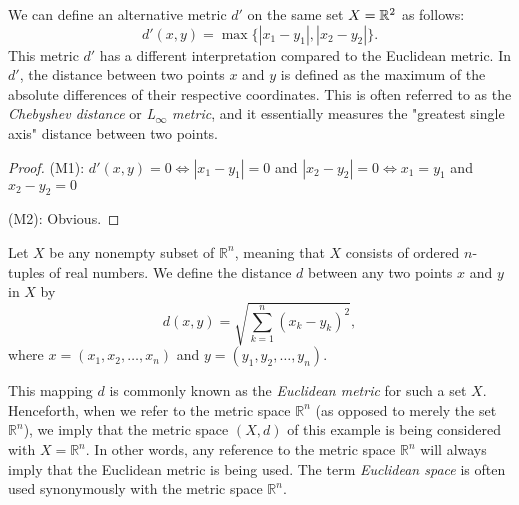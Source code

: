 \begin{example}
    We can define an alternative metric \( d' \) on the same set \( X = \mathbb R^2 \) as follows:
    \[
    d'(x, y) = \max\{|x_1 - y_1|, |x_2 - y_2|\}.
    \]
    This metric \( d' \) has a different interpretation compared to the Euclidean metric. In \( d' \), the distance between two points \( x \) and \( y \) is defined as the maximum of the absolute differences of their respective coordinates. This is often referred to as the \textit{Chebyshev distance} or \textit{L\textsubscript{$\infty$} metric}, and it essentially measures the "greatest single axis" distance between two points.

\end{example}
\begin{proof}
    \item (M1): $d'(x,y) = 0 \iff |x_{1} - y_{1}| =0$ and $|x_{2} - y_{2}| =0 \iff x_1 = y_1$ and $x_2 - y_2 = 0$ 
    \item (M2): Obvious.
    \item 
\end{proof}
\begin{example}
    Let \(X\) be any nonempty subset of \(\mathbb{R}^n\), meaning that \(X\) consists of ordered \(n\)-tuples of real numbers. We define the distance \(d\) between any two points \(x\) and \(y\) in \(X\) by
    \[
    d(x, y) = \sqrt{\sum_{k=1}^{n} (x_k - y_k)^2},
    \]
    where \(x = (x_1, x_2, \ldots, x_n)\) and \(y = (y_1, y_2, \ldots, y_n)\).

    This mapping \(d\) is commonly known as the \textit{Euclidean metric} for such a set \(X\). Henceforth, when we refer to the metric space \(\mathbb{R}^n\) (as opposed to merely the set \(\mathbb{R}^n\)), we imply that the metric space \((X, d)\) of this example is being considered with \(X = \mathbb{R}^n\). In other words, any reference to the metric space \(\mathbb{R}^n\) will always imply that the Euclidean metric is being used. The term \textit{Euclidean space} is often used synonymously with the metric space \(\mathbb{R}^n\).

\end{example}

